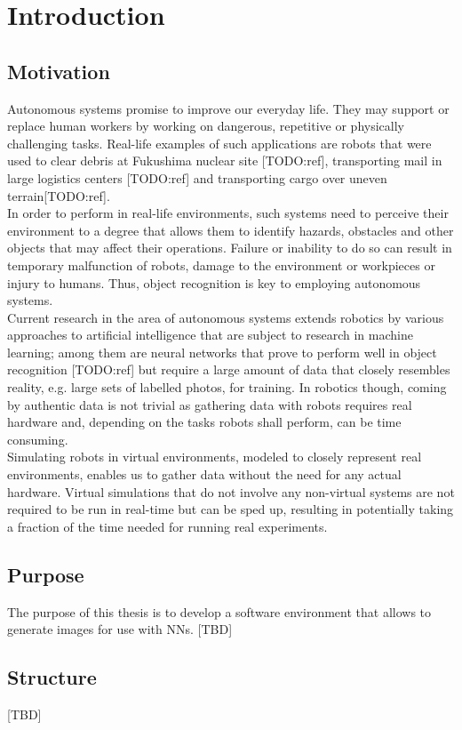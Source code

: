 \chapter{Introduction}

\section{Motivation}
Autonomous systems promise to improve our everyday life. They may support or replace human workers by working on dangerous, repetitive or physically challenging tasks. Real-life examples of such applications are robots that were used to clear debris at Fukushima nuclear site [TODO:ref], transporting mail in large logistics centers [TODO:ref] and transporting cargo over uneven terrain[TODO:ref].\\
In order to perform in real-life environments, such systems need to perceive their environment to a degree that allows them to identify hazards, obstacles and other objects that may affect their operations. Failure or inability to do so can result in temporary malfunction of robots, damage to the environment or workpieces or injury to humans. Thus, object recognition is key to employing autonomous systems.\\
Current research in the area of autonomous systems extends robotics by various approaches to artificial intelligence that are subject to research in machine learning; among them are neural networks that prove to perform well in object recognition [TODO:ref] but require a large amount of data that closely resembles reality, e.g. large sets of labelled photos, for training. In robotics though, coming by authentic data is not trivial as gathering data with robots requires real hardware and, depending on the tasks robots shall perform, can be time consuming.\\
Simulating robots in virtual environments, modeled to closely represent real environments, enables us to gather data without the need for any actual hardware. Virtual simulations that do not involve any non-virtual systems are not required to be run in real-time but can be sped up, resulting in potentially taking a fraction of the time needed for running real experiments.

\section{Purpose}
The purpose of this thesis is to develop a software environment that allows to generate images for use with \acp{NN}.
[TBD]

\section{Structure}
[TBD]